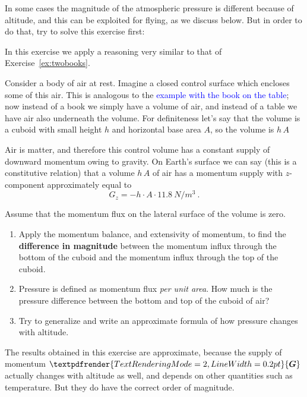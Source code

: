 \documentclass[a4paper,12pt,%
onecolumn,oneside,%
british%
]{memoir}
\renewcommand*{\bm}[1]{\textpdfrender{TextRenderingMode=2,LineWidth=0.2pt}{\boldsymbol{#1}}}
\renewcommand*{\|}[1][]{\nonscript\:#1\vert\nonscript\:\mathopen{}}
\newcommand*{\sect}{\S}%
\renewcommand*{\autoref}[2]{\sidepar{\vspace{-1ex}\footnotesize{\color{blue}\faIcon{%
angle-right%
}\enspace\sect~\ref{#1} page~\pageref{#1}}}\textcolor{blue}{#2}}
\newcommand*{\yG}{\bm{G}}
\begin{document}
In some cases the magnitude of the atmospheric pressure is different because of altitude, and this can be exploited for flying, as we discuss below. But in order to do that, try to solve this exercise first:
\begin{exercise}[label={ex:atmosphericpressure}]
  In this exercise we apply a reasoning very similar to that of Exercise~\ref{ex:twobooks}.

  Consider a body of air at rest. Imagine a closed control surface which encloses some of this air. This is analogous to the \autoref{sec:bal_momentum_statics}{example with the book on the table}; now instead of a book we simply have a volume of air, and instead of a table we have air also underneath the volume. For definiteness let's say that the volume is a cuboid with small height $h$ and horizontal base area $A$, so the volume is $h\,A$

  Air is matter, and therefore this control volume has a constant supply of downward momentum owing to gravity. On Earth's surface we can say (this is a constitutive relation) that a volume $h\,A$ of air has a momentum supply with $z$-component approximately equal to
  \begin{equation*}
    G_{z} = -h\cdot A \cdot \qty{11.8}{N/m^{3}}\ .
  \end{equation*}

  Assume that the momentum flux on the lateral surface of the volume is zero.
  \begin{enumerate}[exerc]
  \item Apply the momentum balance, and extensivity of momentum, to find the \textbf{difference in magnitude} between the momentum influx through the bottom of the cuboid and the momentum influx through the top of the cuboid.
    \item Pressure is defined as momentum flux \emph{per unit area}. How much is the pressure difference between the bottom and top of the cuboid of air?
    \item Try to generalize and write an approximate formula of how pressure changes with altitude.
    \end{enumerate}

    {\color{red}\footnotesize{}\enspace The results obtained in this exercise are approximate, because the supply of momentum $\yG$ actually changes with altitude as well, and depends on other quantities such as temperature. But they do have the correct order of magnitude.\par}
\end{exercise}
\end{document}
